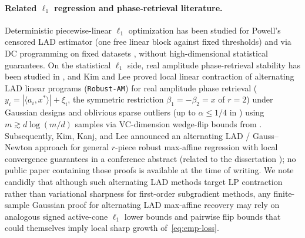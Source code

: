 \documentclass[11pt]{article}
\theoremstyle{plain}
\theoremstyle{remark}
\numberwithin{equation}{section}
\newcommand{\ip}[2]{\langle #1, #2 \rangle}
\begin{document}
\paragraph{Related $\ell_1$ regression and phase-retrieval literature.}
Deterministic piecewise-linear $\ell_1$ optimization has been studied for Powell's censored LAD estimator \cite{powell1984censored,womersley1986censored} (one free linear block against fixed thresholds) and via DC programming on fixed datasets \cite{bagirov2022robust}, without high-dimensional statistical guarantees. On the statistical $\ell_1$ side, real amplitude phase-retrieval stability has been studied in \cite{eldar2014phase,bandeira2014saving,tan2019phase}, and Kim and Lee \cite{kim2025robustpr} proved local linear contraction of alternating LAD linear programs (\texttt{Robust-AM}) for real amplitude phase retrieval ($y_i = |\ip{a_i}{x^*}| + \xi_i$, the symmetric restriction $\beta_1 = -\beta_2 = x$ of $r = 2$) under Gaussian designs and oblivious sparse outliers (up to $\alpha \le 1/4$ in \cite{kim2025robustpr}) using $m \gtrsim d\log(m/d)$ samples via VC-dimension wedge-flip bounds from \cite{tan2019phase}. Subsequently, Kim, Kanj, and Lee announced an alternating LAD / Gauss--Newton approach for general $r$-piece robust max-affine regression with local convergence guarantees in a conference abstract \cite{kim2024mds} (related to the dissertation \cite{kim2024thesis}); no public paper containing those proofs is available at the time of writing. We note candidly that although such alternating LAD methods target LP contraction rather than variational sharpness for first-order subgradient methods, any finite-sample Gaussian proof for alternating LAD max-affine recovery may rely on analogous signed active-cone $\ell_1$ lower bounds and pairwise flip bounds that could themselves imply local sharp growth of~\eqref{eq:emp-loss}.
\end{document}
